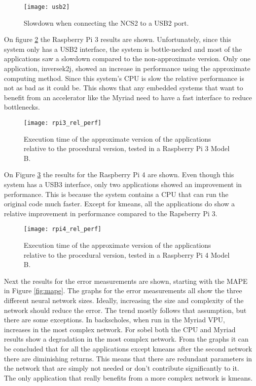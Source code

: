 \begin{figure}[thbp]
	\centering
	\texttt{[image: usb2]}
	\caption{Slowdown when connecting the NCS2 to a USB2 port.}
	\label{fig:usb2}
\end{figure}

On figure \ref{fig:rpi3_rel_perf} the Raspberry Pi 3 results are shown. Unfortunately, since this system only has a USB2 interface, the system is bottle-necked and most of the applications saw a slowdown compared to the non-approximate version. Only one application, inversek2j, showed an increase in performance using the approximate computing method. Since this system's CPU is slow the relative performance is not as bad as it could be. This shows that any embedded systems that want to benefit from an accelerator like the Myriad need to have a fast interface to reduce bottlenecks.

\begin{figure}[htbp]
	\centering
	\texttt{[image: rpi3\_rel\_perf]}
	\caption{Execution time of the approximate version of the applications relative to the procedural version, tested in a Raspberry Pi 3 Model B.}
	\label{fig:rpi3_rel_perf}
\end{figure}

On Figure \ref{fig:rpi4_rel_perf} the results for the Raspberry Pi 4 are shown. Even though this system has a USB3 interface, only two applications showed an improvement in performance. This is because the system contains a CPU that can run the original code much faster. Except for kmeans, all the applications do show a relative improvement in performance compared to the Rapsberry Pi 3.

\begin{figure}[htbp]
	\centering
	\texttt{[image: rpi4\_rel\_perf]}
	\caption{Execution time of the approximate version of the applications relative to the procedural version, tested in a Raspberry Pi 4 Model B.}
	\label{fig:rpi4_rel_perf}
\end{figure}

Next the results for the error measurements are shown, starting with the MAPE in Figure \ref{fig:mape}. The graphs for the error measurements all show the three different neural network sizes. Ideally, increasing the size and complexity of the network should reduce the error. The trend mostly follows that assumption, but there are some exceptions. In backscholes, when run in the Myriad VPU, increases in the most complex network. For sobel both the CPU and Myriad results show a degradation in the most complex network. From the graphs it can be concluded that for all the applications except kmeans after the second network there are diminishing returns. This means that there are redundant parameters in the network that are simply not needed or don't contribute significantly to it. The only application that really benefits from a more complex network is kmeans.

